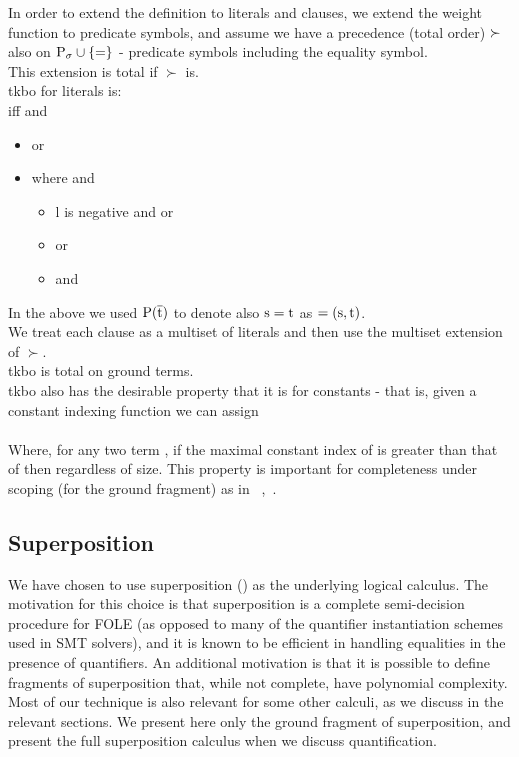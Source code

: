 \noindent
In order to extend the definition to literals and clauses, we extend the weight function to predicate symbols, and assume we have a precedence (total order) $\mathrm{\succ}$ also on $\mathrm{P_{\sigma} \cup \left\{\mathrm{=}\right\}}$ - predicate symbols including the equality symbol.\\
This extension is total if $\succ$ is.\\
tkbo for literals is:\\
 iff  and
\begin{itemize}
	\item {} or
	\item {} where  and
	\begin{itemize}
		\item l is negative and  or
		\item {} or
		\item {} and 
	\end{itemize}
\end{itemize}
In the above we used $\mathrm{P}(\mathrm{\overline{t}})$ to denote also $\mathrm{s=t}$ as $\mathrm{=(s,t)}$.\\
We treat each clause as a multiset of literals and then use the multiset extension of $\succ$.\\
tkbo is total on ground terms.\\
tkbo also has the desirable property that it is  for constants - 
that is, given a constant indexing function  we can assign \\
\\
Where, for any two term , if the maximal constant index of  is greater than that of  then  regardless of size.
This property is important for completeness under scoping (for the ground fragment) as in ~\cite{KovacsVoronkov09},~\cite{McMillan08}.

\subsection*{Superposition}\label{section:preliminaries:superposition}
We have chosen to use superposition (\cite{BachmairGanzingerSuperposition}) as the underlying logical calculus.
The motivation for this choice is that superposition is a complete semi-decision procedure for FOLE (as opposed to many of the quantifier instantiation schemes used in SMT solvers), and it is known to be efficient in handling equalities in the presence of quantifiers.
An additional motivation is that it is possible to define fragments of superposition that, while not complete, 
have polynomial complexity. Most of our technique is also relevant for some other calculi, as we discuss in the relevant sections.
We present here only the ground fragment of superposition, and present the full superposition calculus when we discuss quantification.

